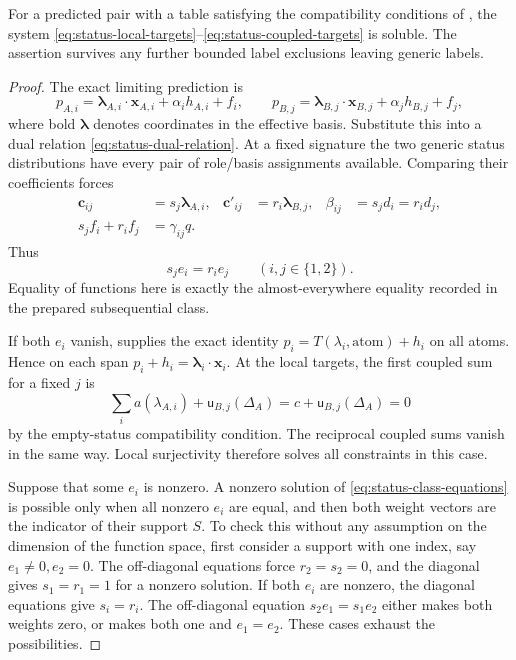 \begin{lemma}
\label{lem:status-predicted}
For a predicted pair with a table satisfying the compatibility
conditions of , the system
\eqref{eq:status-local-targets}--\eqref{eq:status-coupled-targets}
is soluble. The assertion survives any further bounded label
exclusions leaving generic labels.
\end{lemma}

\begin{proof}
The exact limiting prediction is
\[
p_{A,i}=\boldsymbol\lambda_{A,i}\cdot\mathbf x_{A,i}
                 +\alpha_i h_{A,i}+f_i,
\qquad
p_{B,j}=\boldsymbol\lambda_{B,j}\cdot\mathbf x_{B,j}
                 +\alpha_j h_{B,j}+f_j,
\]
where bold $\boldsymbol\lambda$ denotes coordinates in the effective
basis. Substitute this into a dual relation
\eqref{eq:status-dual-relation}. At a fixed signature the two generic
status distributions have every pair of role/basis assignments
available. Comparing their coefficients forces
\begin{align}
\mathbf c_{ij}&=s_j\boldsymbol\lambda_{A,i},&
\mathbf c'_{ij}&=r_i\boldsymbol\lambda_{B,j},&
\beta_{ij}&=s_jd_i=r_id_j,
\label{eq:status-forced-coefficients}\\
s_jf_i+r_if_j&=\gamma_{ij}q.
\label{eq:status-forced-functions}
\end{align}
Thus
\begin{equation}
\label{eq:status-class-equations}
s_je_i=r_ie_j\qquad(i,j\in\{1,2\}).
\end{equation}
Equality of functions here is exactly the almost-everywhere equality
recorded in the prepared subsequential class.

If both $e_i$ vanish,  supplies the exact
identity $p_i=T(\lambda_i,\mathrm{atom})+h_i$ on all atoms. Hence on
each span $p_i+h_i=\boldsymbol\lambda_i\cdot\mathbf x_i$.
At the local targets, the first coupled sum for a fixed $j$ is
\[
\sum_i a(\lambda_{A,i})+
       \mathsf u_{B,j}(\Delta_A)
=c+\mathsf u_{B,j}(\Delta_A)=0
\]
by the empty-status compatibility condition. The reciprocal coupled
sums vanish in the same way. Local surjectivity therefore solves all
constraints in this case.

Suppose that some $e_i$ is nonzero. A nonzero solution of
\eqref{eq:status-class-equations} is possible only when all nonzero
$e_i$ are equal, and then both weight vectors are the indicator of
their support $S$. To check this without any assumption on the dimension
of the function space, first consider a support with one index, say
$e_1\ne0,e_2=0$. The off-diagonal equations force $r_2=s_2=0$,
and the diagonal gives $s_1=r_1=1$ for a nonzero solution. If both
$e_i$ are nonzero, the diagonal equations give $s_i=r_i$.
The off-diagonal equation $s_2e_1=s_1e_2$ either makes both weights
zero, or makes both one and $e_1=e_2$. These cases exhaust the
possibilities.


\end{proof}
